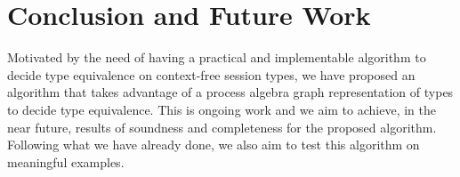 \section{Conclusion and Future Work}
\label{sec:conclusion}

Motivated by the need of having a practical and implementable algorithm to decide type equivalence on context-free session types, we have proposed an algorithm that takes advantage of a process algebra graph representation of types to decide type equivalence. This is ongoing work and we aim to achieve, in the near future, results of soundness and completeness for the proposed algorithm. Following what we have already done, we also aim to test this algorithm on meaningful examples.